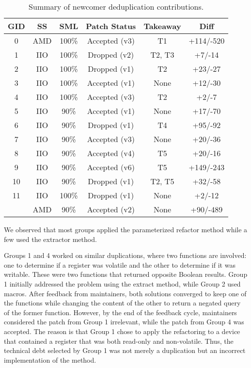 \documentclass[10pt,conference]{IEEEtran}
\begin{document}
\begin{table}[ht]
\centering
\caption{Summary of newcomer deduplication contributions.}
\begin{tabular}{ |c |c |c |c |c | c| }
\hline
\textbf{GID} & \textbf{SS} & \textbf{SML} & \textbf{Patch Status} & \textbf{Takeaway} & \textbf{Diff} \\
\hline
0 & AMD & 100\% & Accepted (v3) & T1 & +114/-520 \\ \hline
1 & IIO & 100\% & Dropped (v2) & T2, T3 & +7/-14 \\ \hline
2 & IIO & 100\% & Dropped (v1) & T2 & +23/-27 \\ \hline
3 & IIO & 100\% & Accepted (v1) & None & +12/-30 \\ \hline
4 & IIO & 100\% & Accepted (v3) & T2 & +2/-7 \\ \hline
5 & IIO & 90\% & Accepted (v1) & None & +17/-70 \\ \hline
6 & IIO & 90\% & Dropped (v1) & T4 & +95/-92 \\ \hline
7 & IIO & 90\% & Accepted (v3) & None & +20/-36 \\ \hline
8 & IIO & 90\% & Accepted (v4) & T5 & +20/-16 \\ \hline
9 & IIO & 90\% & Accepted (v6) & T5 & +149/-243 \\ \hline
10 & IIO & 90\% & Dropped (v1) & T2, T5 & +32/-58 \\ \hline
11 & IIO & 100\% & Dropped (v1) & None & +2/-12 \\
   & AMD & 90\% & Accepted (v2) & None & +90/-489 \\ \hline

\end{tabular}%

\label{tab:stu}
\end{table}

We observed that most groups applied the parameterized refactor method while a few used the extractor method.

Groups 1 and 4 worked on similar duplications, where two functions are involved: one to determine if a register was volatile and the other to determine if it was writable. These were two functions that returned opposite Boolean results. Group 1 initially addressed the problem using the extract method, while Group 2 used macros. After feedback from maintainers, both solutions converged to keep one of the functions while changing the content of the other to return a negated query of the former function. However, by the end of the feedback cycle, maintainers considered the patch from Group 1 irrelevant, while the patch from Group 4 was accepted. The reason is that Group 1 chose to apply the refactoring to a device that contained a register that was both read-only and non-volatile. Thus, the technical debt selected by Group 1 was not merely a duplication but an incorrect implementation of the method.
\end{document}
